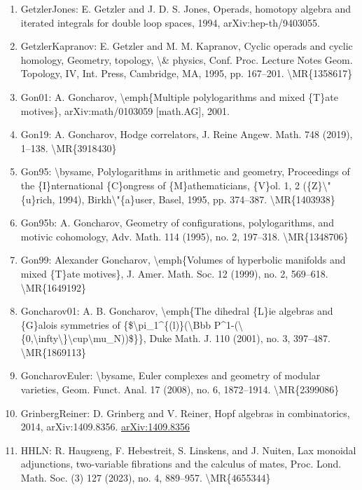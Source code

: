 \documentclass[11pt]{article}
\begin{document}
\begin{enumerate}[leftmargin=*]
  \item GetzlerJones: E. Getzler and J. D. S. Jones, Operads, homotopy algebra and iterated integrals for double loop spaces, 1994, arXiv:hep-th/9403055.
  \item GetzlerKapranov: E. Getzler and M. M. Kapranov, Cyclic operads and cyclic homology, Geometry, topology, \textbackslash{}\& physics, Conf. Proc. Lecture Notes Geom. Topology, IV, Int. Press, Cambridge, MA, 1995, pp. 167--201. \textbackslash{}MR\{1358617\}
  \item Gon01: A. Goncharov, \textbackslash{}emph\{Multiple polylogarithms and mixed \{T\}ate motives\}, arXiv:math/0103059 [math.AG], 2001.
  \item Gon19: A. Goncharov, Hodge correlators, J. Reine Angew. Math. 748 (2019), 1--138. \textbackslash{}MR\{3918430\}
  \item Gon95: \textbackslash{}bysame, Polylogarithms in arithmetic and geometry, Proceedings of the \{I\}nternational \{C\}ongress of \{M\}athematicians, \{V\}ol. 1, 2 (\{Z\}\textbackslash{}"\{u\}rich, 1994), Birkh\textbackslash{}"\{a\}user, Basel, 1995, pp. 374--387. \textbackslash{}MR\{1403938\}
  \item Gon95b: A. Goncharov, Geometry of configurations, polylogarithms, and motivic cohomology, Adv. Math. 114 (1995), no. 2, 197--318. \textbackslash{}MR\{1348706\}
  \item Gon99: Alexander Goncharov, \textbackslash{}emph\{Volumes of hyperbolic manifolds and mixed \{T\}ate motives\}, J. Amer. Math. Soc. 12 (1999), no. 2, 569--618. \textbackslash{}MR\{1649192\}
  \item Goncharov01: A. B. Goncharov, \textbackslash{}emph\{The dihedral \{L\}ie algebras and \{G\}alois symmetries of \{\$\textbackslash{}pi\_1\^{}\{(l)\}(\textbackslash{}Bbb P\^{}1-(\textbackslash{}\{0,\textbackslash{}infty\textbackslash{}\}\textbackslash{}cup\textbackslash{}mu\_N))\$\}\}, Duke Math. J. 110 (2001), no. 3, 397--487. \textbackslash{}MR\{1869113\}
  \item GoncharovEuler: \textbackslash{}bysame, Euler complexes and geometry of modular varieties, Geom. Funct. Anal. 17 (2008), no. 6, 1872--1914. \textbackslash{}MR\{2399086\}
  \item GrinbergReiner: D. Grinberg and V. Reiner, Hopf algebras in combinatorics, 2014, arXiv:1409.8356. \href{https://arxiv.org/abs/1409.8356}{arXiv:1409.8356}
  \item HHLN: R. Haugseng, F. Hebestreit, S. Linskens, and J. Nuiten, Lax monoidal adjunctions, two-variable fibrations and the calculus of mates, Proc. Lond. Math. Soc. (3) 127 (2023), no. 4, 889--957. \textbackslash{}MR\{4655344\}

\end{enumerate}
\end{document}
